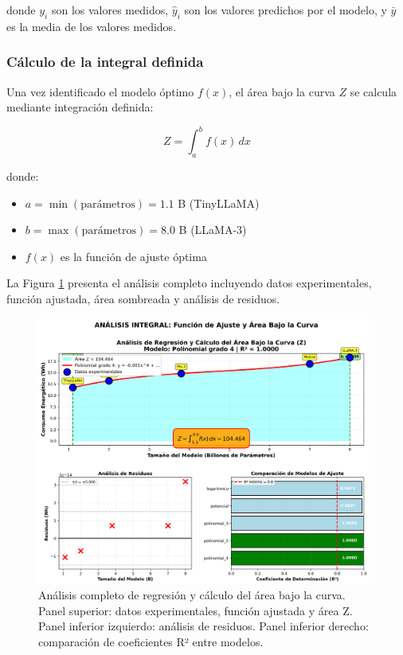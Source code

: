 donde $y_i$ son los valores medidos, $\hat{y}_i$ son los valores predichos por el modelo, y $\bar{y}$ es la media de los valores medidos.

\subsubsection{Cálculo de la integral definida}

Una vez identificado el modelo óptimo $f(x)$, el área bajo la curva $Z$ se calcula mediante integración definida:

\begin{equation}
Z = \int_a^b f(x) \, dx
\end{equation}

donde:
\begin{itemize}
    \item $a = \min(\text{parámetros}) = 1.1$ B (TinyLLaMA)
    \item $b = \max(\text{parámetros}) = 8.0$ B (LLaMA-3)
    \item $f(x)$ es la función de ajuste óptima
\end{itemize}

La Figura \ref{fig:area_bajo_curva} presenta el análisis completo incluyendo datos experimentales, función ajustada, área sombreada y análisis de residuos.

\begin{figure}[H]
    \centering
    \includegraphics[width=0.98\textwidth]{figuras/png/grafico_6_area_bajo_curva.png}
    \caption{Análisis completo de regresión y cálculo del área bajo la curva. Panel superior: datos experimentales, función ajustada y área Z. Panel inferior izquierdo: análisis de residuos. Panel inferior derecho: comparación de coeficientes R² entre modelos.}
    \label{fig:area_bajo_curva}
\end{figure}

